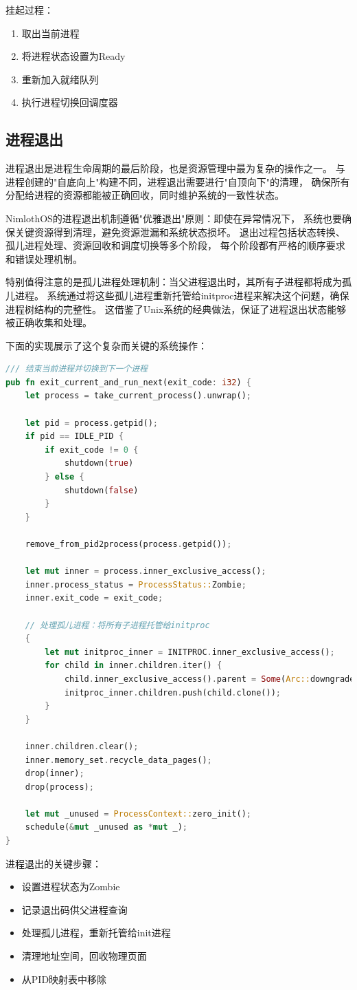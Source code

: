 挂起过程：
\begin{enumerate}
    \item 取出当前进程
    \item 将进程状态设置为Ready
    \item 重新加入就绪队列
    \item 执行进程切换回调度器
\end{enumerate}

\subsection{进程退出}

进程退出是进程生命周期的最后阶段，也是资源管理中最为复杂的操作之一。
与进程创建的"自底向上"构建不同，进程退出需要进行"自顶向下"的清理，
确保所有分配给进程的资源都能被正确回收，同时维护系统的一致性状态。

NimlothOS的进程退出机制遵循"优雅退出"原则：即使在异常情况下，
系统也要确保关键资源得到清理，避免资源泄漏和系统状态损坏。
退出过程包括状态转换、孤儿进程处理、资源回收和调度切换等多个阶段，
每个阶段都有严格的顺序要求和错误处理机制。

特别值得注意的是孤儿进程处理机制：当父进程退出时，其所有子进程都将成为孤儿进程。
系统通过将这些孤儿进程重新托管给initproc进程来解决这个问题，确保进程树结构的完整性。
这借鉴了Unix系统的经典做法，保证了进程退出状态能够被正确收集和处理。

下面的实现展示了这个复杂而关键的系统操作：

\begin{lstlisting}[language=Rust,caption={进程退出实现}, label={lst:process-exit}]
/// 结束当前进程并切换到下一个进程
pub fn exit_current_and_run_next(exit_code: i32) {
    let process = take_current_process().unwrap();
    
    let pid = process.getpid();
    if pid == IDLE_PID {
        if exit_code != 0 {
            shutdown(true)
        } else {
            shutdown(false)
        }
    }

    remove_from_pid2process(process.getpid());

    let mut inner = process.inner_exclusive_access();
    inner.process_status = ProcessStatus::Zombie;
    inner.exit_code = exit_code;
    
    // 处理孤儿进程：将所有子进程托管给initproc
    {
        let mut initproc_inner = INITPROC.inner_exclusive_access();
        for child in inner.children.iter() {
            child.inner_exclusive_access().parent = Some(Arc::downgrade(&INITPROC));
            initproc_inner.children.push(child.clone());
        }
    }
    
    inner.children.clear();
    inner.memory_set.recycle_data_pages();
    drop(inner);
    drop(process);
    
    let mut _unused = ProcessContext::zero_init();
    schedule(&mut _unused as *mut _);
}
\end{lstlisting}

进程退出的关键步骤：
\begin{itemize}
    \item 设置进程状态为Zombie
    \item 记录退出码供父进程查询
    \item 处理孤儿进程，重新托管给init进程
    \item 清理地址空间，回收物理页面
    \item 从PID映射表中移除
\end{itemize}